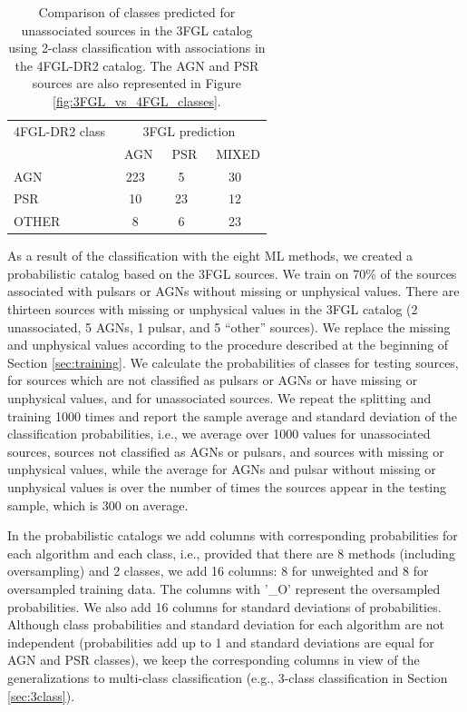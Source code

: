 \begin{table}[!h]
\centering
  
 \renewcommand{\tabcolsep}{0.3mm}
\renewcommand{\arraystretch}{1.5}

    \begin{tabular}{l c c c}
    \hline
    \hline
    4FGL-DR2 class & \multicolumn{3}{c}{3FGL prediction} \\
      &\ AGN &\ PSR &\ MIXED \\
    \hline
    AGN & 223 & 5 &  30 \\ %
    PSR & 10 & 23 &  12  \\ %
    OTHER & 8 & 6 & 23  \\ %
    \hline
    \end{tabular}%
    \vspace{0.2cm}
    \caption{Comparison of classes predicted for unassociated sources in the 3FGL catalog using 2-class classification
    with associations in the 4FGL-DR2 catalog. 
    The AGN and PSR sources are also represented in Figure \ref{fig:3FGL_vs_4FGL_classes}.}
    \label{tab:3FGL_vs_4FGL_2class}
\end{table}


As a result of the classification with the eight ML methods,
we created a probabilistic catalog based on the 3FGL sources.
We train on 70\% of the sources associated with pulsars or AGNs without missing or unphysical values.
There are thirteen sources with missing or unphysical values in the 3FGL catalog (2 unassociated, 5 AGNs, 1 pulsar, and 5 ``other'' sources).
We replace the missing and unphysical values according to the procedure described at the beginning of Section \ref{sec:training}.
We calculate the probabilities of classes for testing sources, for sources which are not classified as pulsars or AGNs or have missing or unphysical values, and for unassociated sources.
We repeat the splitting and training 1000 times and report the sample average and standard deviation of the classification probabilities,
i.e., we average over 1000 values for unassociated sources, sources not classified as AGNs or pulsars, and sources with missing or unphysical values,
while the average for AGNs and pulsar without missing or unphysical values is over the number of times the sources appear in the testing sample, which is 300 on average.


In the probabilistic catalogs we add columns with corresponding probabilities for each algorithm and each class,
i.e., provided that there are 8 methods (including oversampling) and 2 classes, we add 16 columns: 8 for unweighted and 8 for oversampled training data. The columns with '\_O' represent the oversampled probabilities. We also add 16 columns for standard deviations of probabilities. Although class probabilities and standard deviation for each algorithm are not independent (probabilities add up to 1 and standard deviations are equal for AGN and PSR classes), we keep the corresponding columns in view of the generalizations to multi-class classification (e.g., 3-class classification in Section \ref{sec:3class}).


